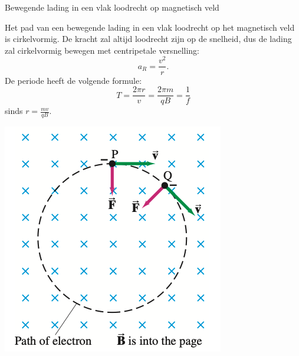 \begin{app}{Bewegende lading in een vlak loodrecht op magnetisch veld}
    \begin{minipage}{.72\textwidth}
        Het pad van een bewegende lading in een vlak loodrecht op het magnetisch veld is cirkelvormig.
        De kracht zal altijd loodrecht zijn op de snelheid, dus de lading zal cirkelvormig bewegen met
        centripetale versnelling:
        \begin{equation*}
            a_{R} = \dfrac{v^2}{r}.
        \end{equation*}
        De periode heeft de volgende formule:
        \begin{equation*}
            T = \dfrac{2\pi r}{v} = \dfrac{2\pi m}{qB} = \dfrac{1}{f}
        \end{equation*}
        sinds $r = \frac{mv}{qB}$.
    \end{minipage}
    \begin{minipage}{.25\textwidth}
        \vspace{-0.3cm}\includegraphics[scale = 0.35]{Images/Magnetisme/CirkelvormigeBewegingMagentischVeld}
    \end{minipage}
\end{app}

\newpage

